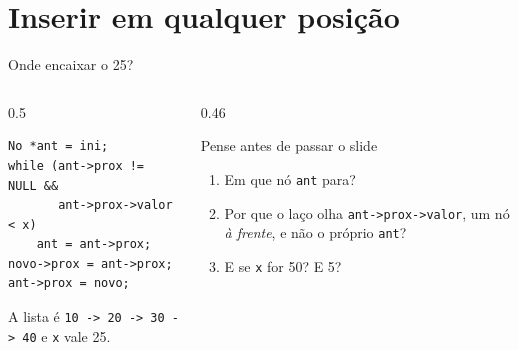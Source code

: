 \documentclass[aspectratio=169]{beamer}
\begin{document}
\section{Inserir em qualquer posição}

\begin{frame}[fragile]{Onde encaixar o 25?}
  \begin{columns}[c]
    \begin{column}{0.5\textwidth}
\begin{lstlisting}[style=tinyC]
No *ant = ini;
while (ant->prox != NULL &&
       ant->prox->valor < x)
    ant = ant->prox;
novo->prox = ant->prox;
ant->prox = novo;
\end{lstlisting}
      \small A lista é \texttt{10 -> 20 -> 30 -> 40} e \texttt{x} vale 25.
    \end{column}
    \begin{column}{0.46\textwidth}
      \begin{block}{Pense antes de passar o slide}
        \small
        \begin{enumerate}
          \item Em que nó \texttt{ant} para?
          \item Por que o laço olha \texttt{ant->prox->valor}, um nó
            \emph{à frente}, e não o próprio \texttt{ant}?
          \item E se \texttt{x} for 50? E 5?
        \end{enumerate}
      \end{block}
    \end{column}
  \end{columns}
\end{frame}
\end{document}
